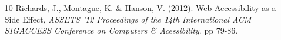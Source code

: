 \documentclass{acm_proc_article-sp}
\begin{document}
\begin{itemize}
\item[10] Richards, J., Montague, K. \& Hanson, V. (2012). Web Accessibility as a Side Effect, {\it ASSETS '12 Proceedings of the 14th International ACM SIGACCESS Conference on Computers \& Acessibility}. pp 79-86.
\end{itemize}
%

%
%
\balancecolumns
\end{document}
